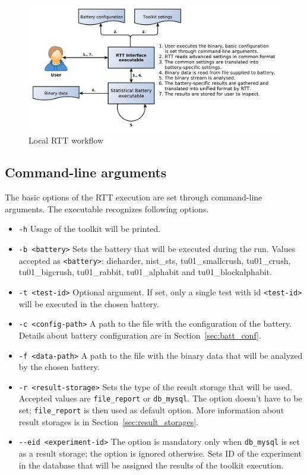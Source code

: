 \documentclass[
	digital,    %
	oneside,    %
	color,
	11pt,
	nocover,
	notable,
	nolof,
	nolot,
]{fithesis3}
\theoremstyle{definition}
\theoremstyle{remark}
\begin{document}
\begin{figure}[h!]
\begin{nomar}
\centering
\includegraphics[width=\paperwidth-4cm]{figures/local-rtt-workflow.pdf}
\end{nomar}
\caption{Local RTT workflow}
\label{fig:rtt_local_workflow}
\end{figure}

\pagebreak
\subsection{Command-line arguments}
The basic options of the RTT execution are set through command-line arguments. The executable recognizes following options.

\begin{itemize}
\item \texttt{-h} Usage of the toolkit will be printed.
\item \texttt{-b <battery>} Sets the battery that will be executed during the run. Values accepted as \texttt{<battery>}: dieharder, nist\_sts, tu01\_smallcrush, tu01\_crush, tu01\_bigcrush, \linebreak tu01\_rabbit, tu01\_alphabit and tu01\_blockalphabit.
\item \texttt{-t <test-id>} Optional argument. If set, only a single test with id \texttt{<test-id>} will be executed in the chosen battery.
\item \texttt{-c <config-path>} A path to the file with the configuration of the battery. Details about battery configuration are in Section~\ref{sec:batt_conf}.
\item \texttt{-f <data-path>} A path to the file with the binary data that will be analyzed by the chosen battery.
\item \texttt{-r <result-storage>} Sets the type of the result storage that will be used. Accepted values are \texttt{file\_report} or \texttt{db\_mysql}. The option doesn't have to be set; \texttt{file\_report} is then used as default option. More information about result storages is in Section~\ref{sec:result_storages}.
\item \texttt{-{}-eid <experiment-id>} The option is mandatory only when \texttt{db\_mysql} is set as a result storage; the option is ignored otherwise. Sets ID of the experiment in the database that will be assigned the results of the toolkit execution.
\end{itemize}
\end{document}
